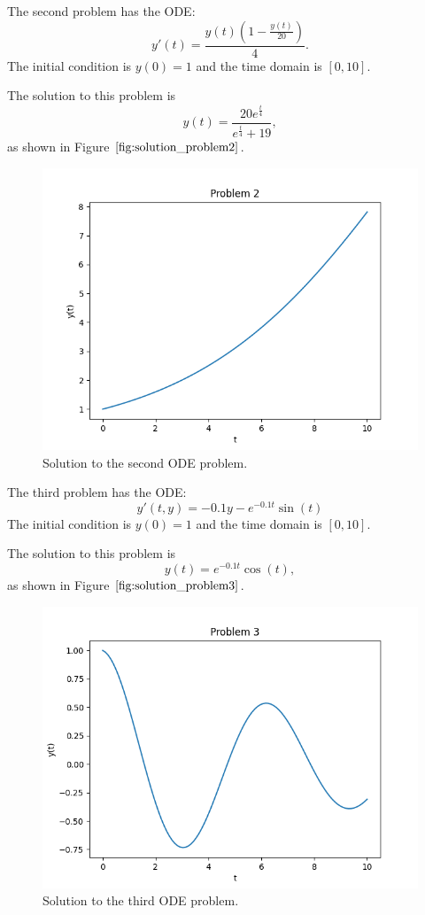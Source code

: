 The second problem has the ODE:
\begin{equation}
y'(t) = \frac{y(t)(1 - \frac{y(t)}{20})}{4}.
\end{equation}
The initial condition is $y(0) = 1$ and the time domain is $[0, 10]$.

The solution to this problem is
\begin{equation}
y(t) = \frac{20e^{\frac{t}{4}}}{e^{\frac{t}{4}} + 19},
\end{equation}
as shown in Figure $\ref{fig:solution_problem2}$.

\begin{figure}[H]
\centering
\includegraphics[width=0.7\linewidth]{./figures/solution_problem2}
\caption{Solution to the second ODE problem.}
\label{fig:solution_problem2}
\end{figure}

The third problem has the ODE:
\begin{equation}
y'(t, y) = -0.1y - e^{-0.1t}\sin(t)
\end{equation}
The initial condition is $y(0) = 1$ and the time domain is $[0, 10]$.

The solution to this problem is 
\begin{equation}
y(t) = e^{-0.1t}\cos(t),
\end{equation}
as shown in Figure $\ref{fig:solution_problem3}$.

\begin{figure}[H]
\centering
\includegraphics[width=0.7\linewidth]{./figures/solution_problem3}
\caption{Solution to the third ODE problem.}
\label{fig:solution_problem3}
\end{figure}

